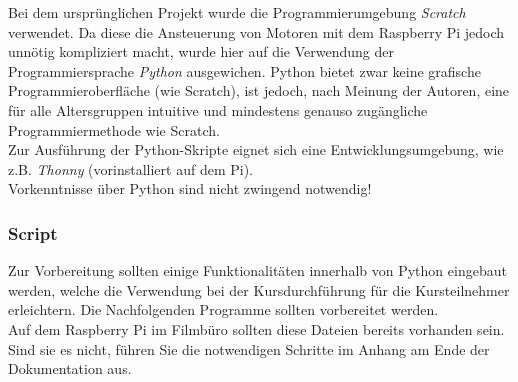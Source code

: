 Bei dem ursprünglichen Projekt wurde die Programmierumgebung \emph{Scratch} verwendet. Da diese die Ansteuerung von Motoren mit dem Raspberry Pi jedoch unnötig kompliziert macht, wurde hier auf die Verwendung der Programmiersprache \emph{Python} ausgewichen. Python bietet zwar keine grafische Programmieroberfläche (wie Scratch), ist jedoch, nach Meinung der Autoren, eine für alle Altersgruppen intuitive und mindestens genauso zugängliche Programmiermethode wie Scratch.\\

Zur Ausführung der Python-Skripte eignet sich eine Entwicklungsumgebung, wie z.B. \emph{Thonny} (vorinstalliert auf dem Pi).\\

Vorkenntnisse über Python sind nicht zwingend notwendig!

\subsubsection{Script}
Zur Vorbereitung sollten einige Funktionalitäten innerhalb von Python eingebaut werden, welche die Verwendung bei der Kursdurchführung für die Kursteilnehmer erleichtern. Die Nachfolgenden Programme sollten vorbereitet werden.\\

Auf dem Raspberry Pi im Filmbüro sollten diese Dateien bereits vorhanden sein. Sind sie es nicht, führen Sie die notwendigen Schritte im Anhang am Ende der Dokumentation aus.

